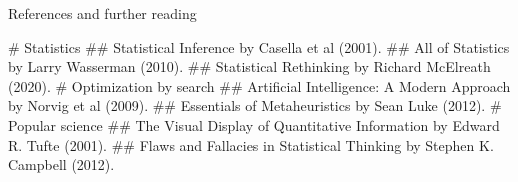 \documentclass[12pt, aspectratio=149]{beamer}
\theoremstyle{plain}
\begin{document}
\begin{frame}[fragile]{References and further reading}
\scriptsize
\begin{easylist}[itemize]
# Statistics
## Statistical Inference by Casella et al (2001).
## All of Statistics by Larry Wasserman (2010).
## Statistical Rethinking by Richard McElreath (2020).
# Optimization by search
## Artificial Intelligence: A Modern Approach by Norvig et al (2009).
## Essentials of Metaheuristics by Sean Luke (2012).
# Popular science
## The Visual Display of Quantitative Information by Edward R. Tufte (2001).
## Flaws and Fallacies in Statistical Thinking by Stephen K. Campbell (2012).
\end{easylist}
\normalsize
\end{frame}
\end{document}
